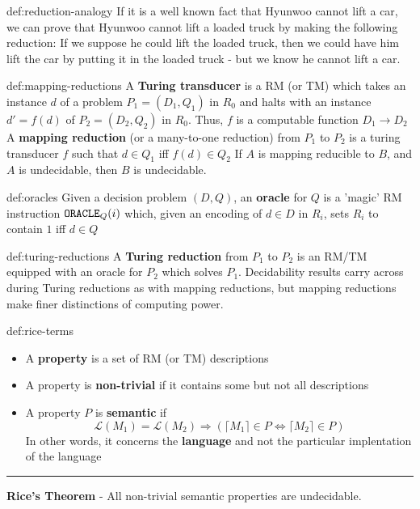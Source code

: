 \documentclass[landscape, 8pt]{extarticle}
\begin{document}
\begin{multicols}{3}
\begin{xmp}{def:reduction-analogy}{}
If it is a well known fact that Hyunwoo cannot lift a car, we can prove that
Hyunwoo cannot lift a loaded truck by making the following reduction: If we
suppose he could lift the loaded truck, then we could have him lift the car by
putting it in the loaded truck - but we know he cannot lift a car.
\end{xmp}
\vspace*{-5pt}
\begin{dfn}{def:mapping-reductions}{}
A \textbf{Turing transducer} is a RM (or TM) which takes an instance $d$ of a problem $P_{1} = (D_{1}, Q_{1})$ in $R_{0}$ and halts with an instance $d' = f(d)$ of $P_{2} = (D_{2}, Q_{2})$ in $R_{0}$. Thus, $f$ is a computable function $D_{1}\to D_{2}$\newline
A \textbf{mapping reduction} (or a many-to-one reduction) from $P_{1}$ to $P_{2}$ is a turing transducer $f$ such that $d\in Q_{1}$ iff $f(d)\in Q_{2}$
\newline
If $A$ is mapping reducible to $B$, and $A$ is undecidable, then $B$ is undecidable.
\end{dfn}
\vspace*{-5pt}
\begin{dfn}[Oracles]{def:oracles}{}
Given a decision problem $(D, Q)$, an \textbf{oracle} for $Q$ is a 'magic' RM instruction $\text{\texttt{ORACLE}}_{Q}(i)$ which, given an encoding of $d\in D$ in $R_{i}$, sets $R_{i}$ to contain $1$ iff $d\in Q$
\end{dfn}
\vspace*{-5pt}
\begin{dfn}{def:turing-reductions}{}
A \textbf{Turing reduction} from $P_{1}$ to $P_{2}$ is an RM/TM equipped with an oracle for $P_{2}$ which solves $P_{1}$.\newline
Decidability results carry across during Turing reductions as with mapping reductions, but mapping reductions make finer distinctions of computing power.
\end{dfn}

\vspace*{-5pt}

\begin{thm}{def:rice-terms}{}
\renewcommand\labelitemi{\tiny$\bullet$}
\begin{itemize}
    \setlength\itemsep{0em}
    \item A \textbf{property} is a set of RM (or TM) descriptions
    \item A property is \textbf{non-trivial} if it contains some but not all descriptions
    \item A property $P$ is \textbf{semantic} if
    \[\mathcal{L}(M_{1}) =\mathcal{L}(M_{2}) \Rightarrow (\lceil M_{1} \rceil \in P \Leftrightarrow \lceil M_{2} \rceil \in P)\]
    In other words, it concerns the \textbf{language} and not the particular implentation of the language
\end{itemize}
\noindent\rule{\textwidth}{0.2pt}
\textbf{Rice's Theorem} - All non-trivial semantic properties are undecidable.
\end{thm}



\end{multicols}
\end{document}
